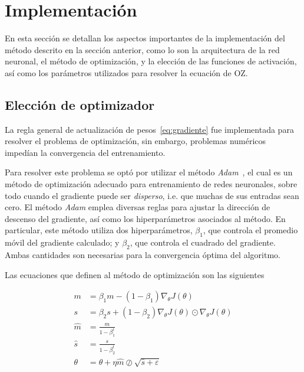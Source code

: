 \section{Implementación}
En esta sección se detallan los aspectos importantes de la implementación del método
descrito en la sección anterior, como lo son la arquitectura de la red neuronal, el método
de optimización, y la elección de las funciones de activación, así como los parámetros
utilizados para resolver la ecuación de OZ.

\subsection{Elección de optimizador}
La regla general de actualización de pesos~\eqref{eq:gradiente} fue implementada para 
resolver el problema de optimización, sin embargo, problemas numéricos impedían la
convergencia del entrenamiento.

Para resolver este problema se optó por utilizar el método \emph{Adam}~\cite{kingmaAdamMethodStochastic2017},
el cual es un método de optimización adecuado para entrenamiento de redes neuronales,
sobre todo cuando el gradiente puede ser \emph{disperso}, i.e. que muchas de sus entradas
sean cero.
El método \emph{Adam} emplea diversas reglas para ajustar la dirección de descenso del
gradiente, así como los hiperparámetros asociados al método. En particular, este método
utiliza dos hiperparámetros, $\beta_1$, que controla el promedio móvil
del gradiente calculado; y $\beta_2$, que controla el cuadrado del gradiente. Ambas
cantidades son necesarias para la convergencia óptima del algoritmo.

Las ecuaciones que definen al método de optimización son las siguientes

\begin{align}
    m &= \beta_1 m - (1 - \beta_1) \nabla_{\theta} J(\theta) \nonumber \\
    s &= \beta_2 s + (1 - \beta_2) \nabla_{\theta} J(\theta) \odot \nabla_{\theta} J(\theta) \nonumber \\
    \hat{m} &= \frac{m}{1 - \beta_1^t} \nonumber \\
    \hat{s} &= \frac{s}{1 - \beta_2^t} \nonumber \\
    \theta &= \theta + \eta \hat{m} \oslash \sqrt{\hat{s} + \varepsilon}
    \label{eq:adam}
\end{align}

